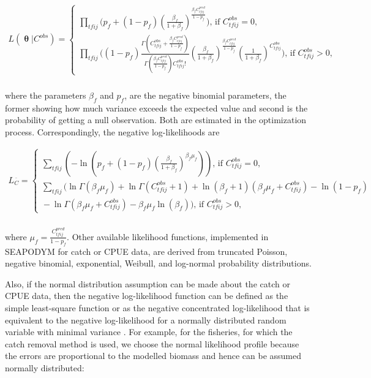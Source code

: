 \begin{eqnarray}
L\left(\boldsymbol \uptheta|C^{obs}\right)  = \left\{\!\begin{array}{ll} 
\prod\limits_{tfij}\!\bigg(p_f+(1-p_f)\left(\frac{\beta_f}{1+\beta_f}\right)^{
\frac{\beta_f C^{pred}_{tfij}}{1-p_f}}\bigg) {\text {, if }} C^{obs}_{tfij}=0,\\ 
\prod\limits_{tfij}\!\Bigg(\left(1-p_f\right)\frac{\Gamma\left(C^{obs}_{tfij}+
\frac{\beta_f C^{pred}_{tfij}}{1-p_f}\right)}{\Gamma\left(\frac{\beta_f
C^{pred}_{tfij}}{1-p_f} \right)C^{obs}_{tfij}!}
\left(\frac{\beta_f}{1+\beta_f}\right)^{\frac{\beta_f C^{pred}_{tfij}}{1-p_f}} 
\left(\frac{1}{1+\beta_f}\right)^{C^{obs}_{tfij}}\Bigg) {\text {, if }} C^{obs}_{tfij}>0,
\end{array}\right. & \nonumber \\
&
\label{eq:negbin}
\end{eqnarray}
 
\noindent where the parameters $\beta_f$ and $p_f$, are the negative binomial parameters, the former showing how much variance exceeds the expected value and second is the probability of getting a null observation. Both are estimated in the optimization process. Correspondingly, the negative log-likelihoods are  

\begin{eqnarray}
L_{\scriptscriptstyle  C}^{\bar{\text{ }}} = \left\{\!\begin{array}{ll} 
\sum\limits_{tfij}\!\left( -\ln\left(p_f+(1-p_f)\left(\frac{\beta_f}{1+\beta_f}\right)^{\beta_f\mu_f}\right) \right) 
{\text {, if }} C^{obs}_{tfij}=0,\\ 

\sum\limits_{tfij}\!\bigg( \ln\Gamma(\beta_f\mu_f) + \ln\Gamma(C^{obs}_{tfij}+1)+\ln(\beta_f+1)\left(\beta_f\mu_f + C^{obs}_{tfij}\right) - \ln(1-p_f) \nonumber \\
 \mbox{}- \ln\Gamma(\beta_f\mu_f+C^{obs}_{tfij}) - \beta_f\mu_f\ln(\beta_f) \bigg) 
{\text {, if }} C^{obs}_{tfij}>0,
\end{array}\right. & \nonumber \\
&
\label{eq:C-like-negbinz}
\end{eqnarray}

\noindent where $\mu_f=\frac{C^{pred}_{tfij}}{1-p_f}$. Other available likelihood functions, implemented in SEAPODYM for catch or CPUE data, are derived from truncated Poisson, negative binomial, exponential, Weibull, and log-normal probability distributions. 

Also, if the normal distribution assumption can be made about the catch or CPUE data, then the negative log-likelihood function can be defined as the simple least-square function or as the negative concentrated log-likelihood that is equivalent to the negative log-likelihood for a normally distributed random variable with minimal variance \citep{Fournier}. For example, for the fisheries, for which the catch removal method is used, we choose the normal likelihood profile because the errors are proportional to the modelled biomass and hence can be assumed normally distributed:

